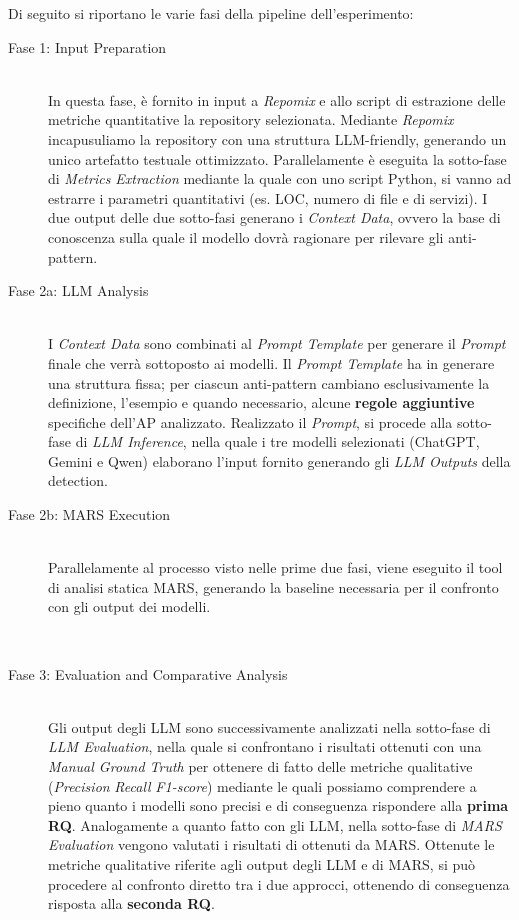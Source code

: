 Di seguito si riportano le varie fasi della pipeline dell'esperimento:
\begin{description}
    \item[Fase 1: Input Preparation]
    \hfill \\
    In questa fase, è fornito in input a \textit{Repomix} e allo script di estrazione delle metriche quantitative la repository selezionata. 
    Mediante \textit{Repomix} incapusuliamo la repository con una struttura LLM-friendly, generando un unico artefatto testuale ottimizzato. 
    Parallelamente è eseguita la sotto-fase di \textit{Metrics Extraction} mediante la quale con uno script Python, si vanno ad estrarre i parametri quantitativi (es. LOC, numero di file e di servizi). 
    I due output delle due sotto-fasi generano i \textit{Context Data}, ovvero la base di conoscenza sulla quale il modello dovrà ragionare per rilevare gli anti-pattern. 
    
    \item[Fase 2a: LLM Analysis]
    \hfill \\
    I \textit{Context Data} sono combinati al \textit{Prompt Template} per generare il \textit{Prompt} finale che verrà sottoposto ai modelli. 
    Il \textit{Prompt Template} ha in generare una struttura fissa; per ciascun anti-pattern cambiano esclusivamente la definizione, l'esempio e quando necessario, alcune \textbf{regole aggiuntive} specifiche dell'AP analizzato.
    Realizzato il \textit{Prompt}, si procede alla sotto-fase di \textit{LLM Inference}, nella quale i tre modelli selezionati (ChatGPT, Gemini e Qwen) elaborano l'input fornito generando gli \textit{LLM Outputs} della detection.

    
    \item[Fase 2b: MARS Execution]
    \hfill \\
    Parallelamente al processo visto nelle prime due fasi, viene eseguito il tool di analisi statica MARS, generando la baseline necessaria per il confronto con gli output dei modelli.

    \hfill \\
    \item[Fase 3: Evaluation and Comparative Analysis]
    \hfill \\
    Gli output degli LLM sono successivamente analizzati nella sotto-fase di \textit{LLM Evaluation}, nella quale si confrontano i risultati ottenuti con una \textit{Manual Ground Truth} per ottenere di fatto delle metriche qualitative (\textit{Precision} \textit{Recall} \textit{F1-score}) mediante le quali possiamo comprendere a pieno quanto i modelli sono precisi e di conseguenza rispondere alla \textbf{prima RQ}.
    Analogamente a quanto fatto con gli LLM, nella sotto-fase di \textit{MARS Evaluation} vengono valutati i risultati di ottenuti da MARS. 
    Ottenute le metriche qualitative riferite agli output degli LLM e di MARS, si può procedere al confronto diretto tra i due approcci, ottenendo di conseguenza risposta alla \textbf{seconda RQ}.
\end{description}

